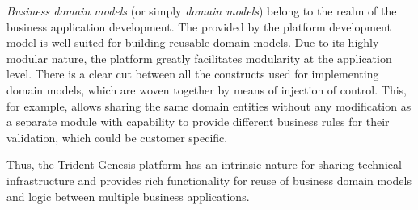   \emph{Business domain models} (or simply \emph{domain models}) belong to the realm of the business application development.
  The provided by the platform development model is well-suited for building reusable domain models.
  Due to its highly modular nature, the platform greatly facilitates modularity at the application level.
  There is a clear cut between all the constructs used for implementing domain models, which are woven together by means of injection of control.
  This, for example, allows sharing the same domain entities without any modification as a separate module with capability to provide different business rules for their validation, which could be customer specific.

  Thus, the Trident Genesis platform has an intrinsic nature for sharing technical infrastructure and provides rich functionality for reuse of business domain models and logic between multiple business applications.